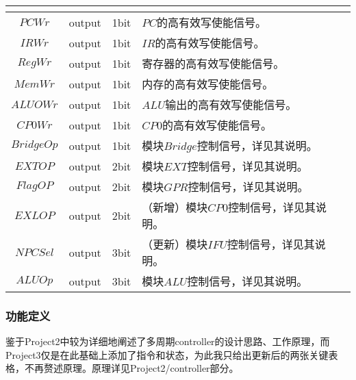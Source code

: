 \documentclass[main.tex]{subfiles}
\begin{document}
\begin{center}
\begin{longtable}[]{c c c l}
{        } \\
        \midrule
        $PCWr$ & output & 1bit & $PC$的高有效写使能信号。\\
        $IRWr$ & output & 1bit & $IR$的高有效写使能信号。\\
        $RegWr$ & output & 1bit & 寄存器的高有效写使能信号。\\
        $MemWr$ & output & 1bit & 内存的高有效写使能信号。\\
        $ALUOWr$ & output & 1bit & $ALU$输出的高有效写使能信号。\\
        $CP0Wr$ & output & 1bit & $CP0$的高有效写使能信号。\\
        \midrule
        $BridgeOp$ & output & 1bit & 模块$Bridge$控制信号，详见其说明。\\
        $EXTOP$ & output & 2bit & 模块$EXT$控制信号，详见其说明。\\
        $FlagOP$ & output & 2bit & 模块$GPR$控制信号，详见其说明。\\
        $EXLOP$ & output & 2bit & （新增）模块$CP0$控制信号，详见其说明。\\
        $NPCSel$ & output & 3bit & （更新）模块$IFU$控制信号，详见其说明。\\
        $ALUOp$ & output & 3bit & 模块$ALU$控制信号，详见其说明。\\
        \bottomrule
    \end{longtable}
\end{center}

\clearpage
\subsubsection{功能定义}

鉴于Project2中较为详细地阐述了多周期controller的设计思路、工作原理，而Project3仅是在此基础上添加了指令和状态，为此我只给出更新后的两张关键表格，不再赘述原理。原理详见Project2/controller部分。
\end{document}
